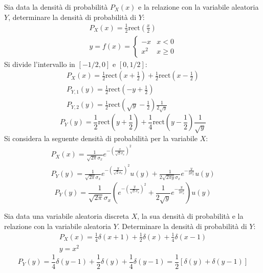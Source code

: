 \documentclass{article}
\newcommand{\rect}{\mathrm{rect}}
\begin{document}
Sia data la densità di probabilità $P_X(x)$ e la relazione con la variabile aleatoria $Y$, determinare la densità di probabilità di $Y$:
\begin{gather*}
    P_X(x)=\displaystyle\frac{1}{2}\rect\left(\frac{x}{2}\right)\\
    y=f(x)=\begin{cases}
        -x&x<0\\
        x^2&x\geq 0
    \end{cases}
\end{gather*}
Si divide l'intervallo in $[-1/2,0]$ e $[0,1/2]$:
\begin{gather*}
    P_X(x)=\displaystyle\frac{1}{2}\rect\left(x+\frac{1}{2}\right)+\frac{1}{2}\rect\left(x-\frac{1}{2}\right)\\
    P_{Y,1}(y)=\displaystyle\frac{1}{2}\rect\left(-y+\frac{1}{2}\right)\\
    P_{Y,2}(y)=\displaystyle\frac{1}{2}\rect\left(\sqrt{y}-\frac{1}{2}\right)\frac{1}{2\sqrt{y}}
\end{gather*}
\begin{equation}
    P_Y(y)=\displaystyle\frac{1}{2}\rect\left(y+\frac{1}{2}\right)+\frac{1}{4}\rect\left(y-\frac{1}{2}\right)\frac{1}{\sqrt{y}}
\end{equation}
Si considera la seguente densità di probabilità per la variabile $X$:
\begin{gather*}
    P_X(x)=\displaystyle\frac{1}{\sqrt{2\pi}\sigma_x}e^{-\left(\frac{x}{\sqrt2\sigma_x}\right)^2}\\
    P_Y(y)=\displaystyle\frac{1}{\sqrt{2\pi}\sigma_x}e^{-\left(\frac{y}{\sqrt2\sigma_x}\right)^2}u(y)+\frac{1}{2\sqrt{2\pi y} \sigma_x}e^{-\frac{y}{2\sigma_x^2}}u(y)
\end{gather*}
\begin{equation}
    P_Y(y)=\displaystyle\frac{1}{\sqrt{2\pi}\sigma_x}\left(e^{-\left(\frac{y}{\sqrt2\sigma_x}\right)^2}+\frac{1}{2\sqrt{y}}e^{-\frac{y}{2\sigma_x^2}}\right)u(y)
\end{equation}



Sia data una variabile aleatoria discreta $X$, la sua densità di probabilità e la relazione con la variabile aleatoria $Y$. Determinare la densità di probabilità di $Y$:
\begin{gather*}
    P_X(x)=\displaystyle\frac{1}{4}\delta(x+1)+\frac{1}{2}\delta(x)+\frac{1}{4}\delta(x-1)\\
    y=x^2
\end{gather*}
\begin{equation}
    P_Y(y)=\displaystyle\frac{1}{4}\delta(y-1)+\frac{1}{2}\delta(y)+\frac{1}{4}\delta(y-1)=\frac{1}{2}\left[\delta(y)+\delta(y-1)\right]
\end{equation}
\end{document}

